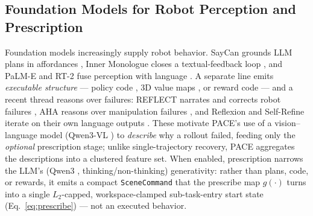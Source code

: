 \documentclass[letterpaper]{article} %
\begin{document}
\subsection{Foundation Models for Robot Perception and Prescription}
Foundation models increasingly supply robot behavior. SayCan grounds LLM plans in
affordances \cite{ahn2022saycan}, Inner Monologue closes a textual-feedback loop
\cite{huang2022innermonologue}, and PaLM-E and RT-2 fuse perception with language
\cite{driess2023palme,brohan2023rt2}. A separate line emits \emph{executable
structure} --- policy code
\cite{liang2023codeaspolicies,singh2023progprompt}, 3D value maps
\cite{huang2023voxposer}, or reward code
\cite{ma2024eureka,yu2023language2rewards} --- and a recent thread reasons over
failures: REFLECT narrates and corrects robot failures \cite{liu2023reflect}, AHA
reasons over manipulation failures \cite{duan2025aha}, and Reflexion and Self-Refine
iterate on their own language outputs
\cite{shinn2023reflexion,madaan2023selfrefine}. These motivate PACE's use of a
vision--language model (Qwen3-VL \cite{bai2025qwen3vl}) to \emph{describe} why a
rollout failed, feeding only the \emph{optional} prescription stage; unlike
single-trajectory recovery, PACE aggregates the descriptions into a clustered
feature set. When enabled, prescription narrows the LLM's (Qwen3
\cite{yang2025qwen3}, thinking/non-thinking) generativity: rather than plans, code,
or rewards, it emits a compact \texttt{SceneCommand} that the prescribe map
$g(\cdot)$ turns into a single $L_2$-capped, workspace-clamped sub-task-entry start
state (Eq.~\eqref{eq:prescribe}) --- not an executed behavior.
\end{document}
